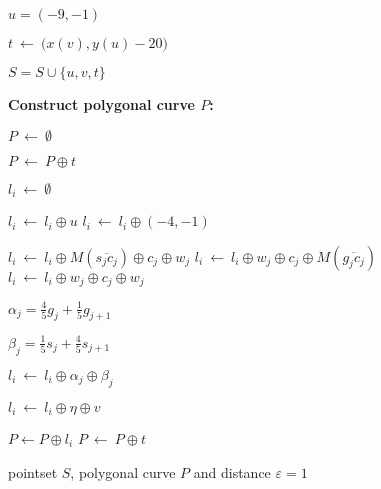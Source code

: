 \documentclass[12pt]{dalthesis}
\newcommand{\eps}{\varepsilon}
\newcommand{\eq}{{\ \leftarrow\ }}
\newcommand{\pset}{S}
\newcommand{\ap}{\oplus}
\newcommand{\Seg}[1]{{\overline{#1}}}
\newcommand{\cfev}{{l}}
\begin{document}
\begin{algorithm}
\begin{algorithmic}[1]
	\STATE $u = (-9,-1)$

	\STATE $t \eq \big(x(v),y(u) -20\big)$

    \STATE $\pset = \pset \cup \{u, v, t\}$ \label{l:makeSEnd}



 	

\vspace{0.15in}

	\hspace{-0.25in} {\bf Construct polygonal curve $P$:}  

	
	\STATE $P \eq \emptyset$ \label{l:makeP}

		

	\STATE $P \eq P \ap t$  


	   \label{l:mainstart}

		\STATE  $\cfev_i \eq \emptyset$ \label{l:startofL}

		\STATE  $\cfev_{i} \eq \cfev_{i} \ap u$ \STATE $\cfev_{i} \eq \cfev_{i} \ap (-4,-1) $  \label{l:Adduh1toell}
		 \label{l:looptoMakeL}	

	

			 \label{l:makeclausestart}	
\STATE $\cfev_{i} \eq \cfev_{i} \ap M(\Seg{s_jc_j}) \ap c_j \ap w_j  $
\STATE $\cfev_{i} \eq \cfev_{i} \ap w_j \ap c_j \ap M(\Seg{g_jc_j} ) $
			\ELSE		
			\STATE $\cfev_i \eq  \cfev_i \ap w_j \ap c_j \ap w_j$
			\ENDIF \label{l:makeclauseend}



			\STATE $\alpha_j =  \frac{4}{5} g_j + \frac{1}{5} g_{j+1}$ \label{l:alpha}

			\STATE $\beta_j = \frac{1}{5} s_j + \frac{4}{5} s_{j+1} $ \label{l:beta}
			
			\STATE $\cfev_i \eq \cfev_i \ap \alpha_j \ap \beta_j$


			\ENDIF

		
		\ENDFOR
	
		\STATE $\cfev_i \eq \cfev_i \ap \eta \ap v$ \label{l:subcurve}


		\STATE  $P \leftarrow P \ap \cfev_i$ 
		\STATE  $P \eq P \ap t$
		   
		
		

	\ENDFOR


	\vspace{0.05in}
\RETURN  pointset $\pset$, polygonal curve $P$ and distance $\eps = 1$
	

\end{algorithmic}
\end{algorithm}
\end{document}

